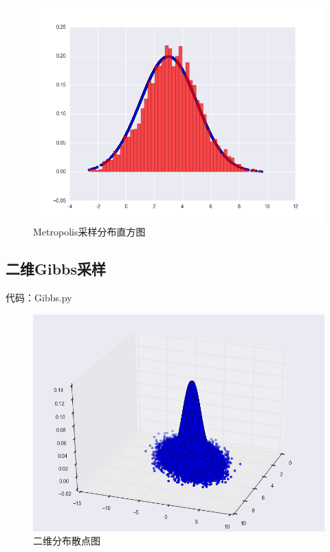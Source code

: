 \documentclass{ctexart}
\begin{document}
\begin{figure}[H]
\begin{center}
\includegraphics[width=1\textwidth]{fig/M-H.png} %
\caption{Metropolis采样分布直方图}
\end{center}
\end{figure}

\subsection{二维Gibbs采样}
代码：Gibbs.py


\begin{figure}[H]
\begin{center}
\includegraphics[width=1\textwidth]{fig/gibbs_twodimen_density.png} %
\caption{二维分布散点图}
\end{center}
\end{figure}
\end{document}
